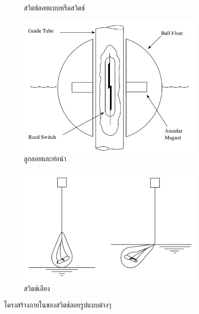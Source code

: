\documentclass[final,11pt,a4paper]{article}
\begin{document}
\begin{figure}
\begin{subfigure}[b]{0.4\textwidth}
        \caption{สวิตช์ลอยแบบหรีดสวิตช์}
        \label{fig:mcfs2}
    \end{subfigure}
    \hfill
    \begin{subfigure}[b]{0.4\textwidth}
        \centering
        \includegraphics[width=\textwidth]{images/Screenshot_3.jpg}
        \caption{ลูกลอยและท่อนำ}
        \label{fig:mcfs3}
    \end{subfigure}
    \hfill
    \begin{subfigure}[b]{0.4\textwidth}
        \centering
        \includegraphics[width=\textwidth]{images/Screenshot_5.jpg}
        \caption{สวิตช์เอียง}
        \label{fig:mcfs4}
    \end{subfigure}
    \hfill
    \caption{โครงสร้างภายในของสวิตช์ลอยรูปแบบต่างๆ}
    \label{fig:mcfs}
\end{figure}
\end{document}
